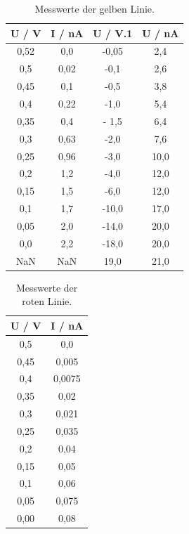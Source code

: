 \begin{table}
  \centering
  \caption{Messwerte der gelben Linie.}
  \label{tab:spek4}
  \begin{tabular}{c c c c}
    \toprule
    U / V & I / nA & U / V.1 & U / nA \\
    \midrule
     0,52 &    0,0 &   -0,05 &    2,4 \\
      0,5 &   0,02 &    -0,1 &    2,6 \\
     0,45 &    0,1 &    -0,5 &    3,8 \\
      0,4 &   0,22 &    -1,0 &    5,4 \\
     0,35 &    0,4 &   - 1,5 &    6,4 \\
      0,3 &   0,63 &    -2,0 &    7,6 \\
     0,25 &   0,96 &    -3,0 &   10,0 \\
      0,2 &    1,2 &    -4,0 &   12,0 \\
     0,15 &    1,5 &    -6,0 &   12,0 \\
      0,1 &    1,7 &   -10,0 &   17,0 \\
     0,05 &    2,0 &   -14,0 &   20,0 \\
      0,0 &    2,2 &   -18,0 &   20,0 \\
      NaN &    NaN &    19,0 &   21,0 \\
    \bottomrule
  \end{tabular}
\end{table}

\begin{table}
  \centering
  \caption{Messwerte der roten Linie.}
  \label{tab:spek5}
  \begin{tabular}{c c}
    \toprule
    U / V & I / nA \\
    \midrule
      0,5 &    0,0 \\
     0,45 &  0,005 \\
      0,4 & 0,0075 \\
     0,35 &   0,02 \\
      0,3 &  0,021 \\
     0,25 &  0,035 \\
      0,2 &   0,04 \\
     0,15 &   0,05 \\
      0,1 &   0,06 \\
     0,05 &  0,075 \\
     0,00 &   0,08 \\
    \bottomrule
    \end{tabular}
\end{table}

